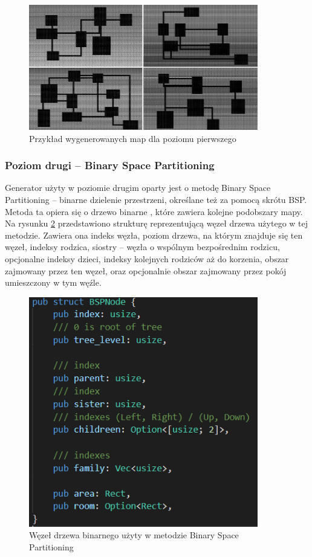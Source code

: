 \documentclass[12pt,twoside]{article}
\begin{document}
\FloatBarrier
\begin{figure}[h]
	\centering
	\includegraphics[width=10cm]{images/generators/level1.png}
	\caption{Przykład wygenerowanych map dla poziomu pierwszego}
	\label{generators:level1}
\end{figure}
\FloatBarrier


\subsubsection{Poziom drugi -- Binary Space Partitioning}
Generator użyty w poziomie drugim oparty jest o metodę Binary Space Partitioning \cite{bsp_source} -- binarne dzielenie przestrzeni, określane też za pomocą skrótu BSP. Metoda ta opiera się o drzewo binarne \cite{book_algo}, które zawiera kolejne podobszary mapy. Na rysunku \ref{generators:bsp_node} przedstawiono strukturę reprezentującą węzeł drzewa użytego w tej metodzie. Zawiera ona indeks węzła, poziom drzewa, na którym znajduje się ten węzeł, indeksy rodzica, siostry -- węzła o wspólnym bezpośrednim rodzicu, opcjonalne indeksy dzieci, indeksy kolejnych rodziców aż do korzenia, obszar zajmowany przez ten węzeł, oraz opcjonalnie obszar zajmowany przez pokój umieszczony w tym węźle.

\FloatBarrier
\begin{figure}[h]
	\centering
	\includegraphics[width=10cm]{images/generators/bsp_node.png}
	\caption{Węzeł drzewa binarnego użyty w metodzie Binary Space Partitioning}
	\label{generators:bsp_node}
\end{figure}
\FloatBarrier
\end{document}
